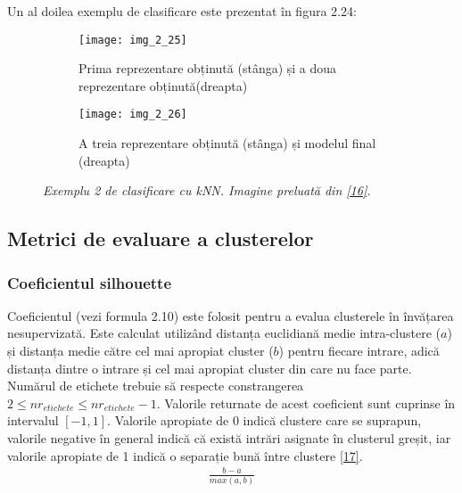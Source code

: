 Un al doilea exemplu de clasificare este prezentat în figura 2.24:
\begin{figure}[!h]
  \begin{subfigure}[b]{0.49\textwidth}
    \texttt{[image: img\_2\_25]}
    \caption{Prima reprezentare obținută (stânga) și a doua reprezentare obținută(dreapta)}
    \label{fig:f1}
  \end{subfigure}
  \hfill
  \begin{subfigure}[b]{0.49\textwidth}
    \texttt{[image: img\_2\_26]}
    \caption{A treia reprezentare obținută (stânga) și modelul final (dreapta)}
    \label{fig:f2}
  \end{subfigure}
  \caption[Exemplu 2 de clasificare cu kNN]{\textit{Exemplu 2 de clasificare cu kNN. Imagine preluată din \hyperlink{gongdeguo}{[16]}.}}
\end{figure}

\subsection{Metrici de evaluare a clusterelor}

\subsubsection{Coeficientul silhouette}

Coeficientul (vezi formula 2.10) este folosit pentru a evalua clusterele în învățarea nesupervizată. Este calculat utilizând distanța euclidiană medie intra-clustere ($a$) și distanța medie către cel mai apropiat cluster ($b$) pentru fiecare intrare, adică distanța dintre o intrare și cel mai apropiat cluster din care nu face parte. Numărul de etichete trebuie să respecte constrangerea $2 \leq nr_{etichete} \leq nr_{etichete} - 1$. Valorile returnate de acest coeficient sunt cuprinse în intervalul $[-1, 1]$. Valorile apropiate de 0 indică clustere care se suprapun, valorile negative în general indică că există intrări asignate în clusterul greșit, iar valorile apropiate de 1 indică o separație bună între clustere \hyperlink{silhouette}{[17]}.
\begin{align}
	\frac{b-a}{max(a,b)}
\end{align}
